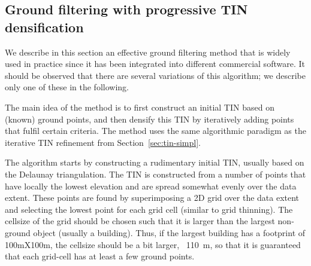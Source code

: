 %
\subsection{Ground filtering with progressive TIN densification}%

We describe in this section an effective ground filtering method that is widely used in practice since it has been integrated into different commercial software.
It should be observed that there are several variations of this algorithm; we describe only one of these in the following.

%

The main idea of the method is to first construct an initial TIN based on (known) ground points, and then densify this TIN by iteratively adding points that fulfil certain criteria.
The method uses the same algorithmic paradigm as the iterative TIN refinement from Section~\ref{sec:tin-simpl}.

%

The algorithm starts by constructing a rudimentary initial TIN, usually based on the Delaunay triangulation. 
The TIN is constructed from a number of points that have locally the lowest elevation and are spread somewhat evenly over the data extent.
These points are found by superimposing a 2D grid over the data extent and selecting the lowest point for each grid cell (similar to grid thinning).
The cellsize of the grid should be chosen such that it is larger than the largest non-ground object (usually a building).
Thus, if the largest building has a footprint of 100mX100m, the cellsize should be a bit larger, \eg\ \qty{110}{m}, so that it is guaranteed that each grid-cell has at least a few ground points.

%

